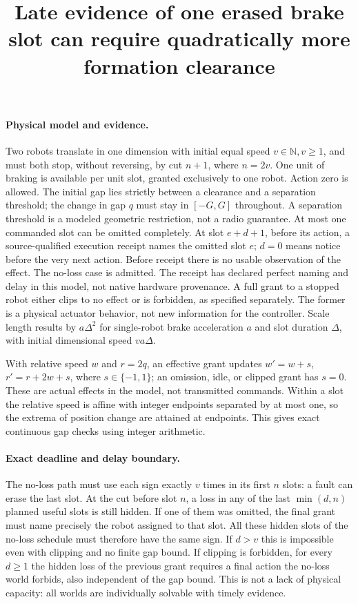 \documentclass{article}
\begin{document}
\title{Late evidence of one erased brake slot can require quadratically more formation clearance}
\maketitle

\paragraph{Physical model and evidence.}
Two robots translate in one dimension with initial equal speed
\(v\in\mathbb{N},v\ge1\), and must both stop, without
reversing, by cut \(n+1\), where \(n=2v\).
One unit of braking is available per unit slot, granted
exclusively to one robot. Action zero is allowed.
The initial gap lies strictly between a clearance and a
separation threshold; the change in gap \(q\) must stay in
\([-G,G]\) throughout. A separation threshold is a modeled
geometric restriction, not a radio guarantee.
At most one commanded slot can be omitted completely.
At slot \(e+d+1\), before its action, a source-qualified
execution receipt names the omitted slot \(e\); \(d=0\)
means notice before the very next action. Before receipt
there is no usable observation of the effect. The no-loss
case is admitted. The receipt has declared perfect naming
and delay in this model, not native hardware provenance.
A full grant to a stopped robot either clips to no effect
or is forbidden, as specified separately. The former is
a physical actuator behavior, not new information for the
controller. Scale length results by \(a\Delta^2\) for
single-robot brake acceleration \(a\) and slot duration
\(\Delta\), with initial dimensional speed \(va\Delta\).

With relative speed \(w\) and \(r=2q\), an effective
grant updates \(w'=w+s\), \(r'=r+2w+s\),
where \(s\in\{-1,1\}\); an omission, idle, or clipped
grant has \(s=0\). These are actual effects in the model,
not transmitted commands. Within a slot the relative
speed is affine with integer endpoints separated by at
most one, so the extrema of position change are attained
at endpoints. This gives exact continuous gap checks
using integer arithmetic.

\paragraph{Exact deadline and delay boundary.}
The no-loss path must use each sign exactly \(v\) times
in its first \(n\) slots: a fault can erase the last slot.
At the cut before slot \(n\), a loss in any of the last
\(\min(d,n)\) planned useful slots is still hidden. If one
of them was omitted, the final grant must name precisely
the robot assigned to that slot. All these hidden slots
of the no-loss schedule must therefore have the same sign.
If \(d>v\) this is impossible even with clipping and no
finite gap bound. If clipping is forbidden, for every
\(d\ge1\) the hidden loss of the previous grant requires
a final action the no-loss world forbids, also independent
of the gap bound. This is not a lack of physical capacity:
all worlds are individually solvable with timely evidence.
\end{document}
